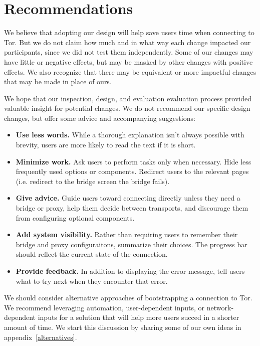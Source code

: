 \documentclass[USenglish,oneside,twocolumn]{article}
\begin{document}
\section{Recommendations}
\label{recommendations}
We believe that adopting our design will help save users time when connecting to Tor. But we do not claim how much and in what way each change impacted our participants, since we did not test them independently. Some of our changes may have little or negative effects, but may be masked by other changes with positive effects. We also recognize that there may be equivalent or more impactful changes that may be made in place of ours. 

We hope that our inspection, design, and evaluation evaluation process provided valuable insight for potential changes. We do not recommend our specific design changes, but offer some advice and accompanying suggestions: \\

\begin{itemize}
\item {\bfseries Use less words.} While a thorough explanation isn't always possible with brevity, users are more likely to read the text if it is short.
\item {\bfseries Minimize work.} Ask users to perform tasks only when necessary. Hide less frequently used options or components. Redirect users to the relevant pages (i.e. redirect to the bridge screen the bridge fails).  
\item {\bfseries Give advice.} Guide users toward connecting directly unless they need a bridge or proxy, help them decide between transports, and discourage them from configuring optional components. 
\item {\bfseries Add system visibility.} Rather than requiring users to remember their bridge and proxy configuraitons, summarize their choices. The progress bar should reflect the current state of the connection.
\item {\bfseries Provide feedback.} In addition to displaying the error message, tell users what to try next when they encounter that error. 
\end{itemize}

We should consider alternative approaches of bootstrapping a connection to Tor. We recommend leveraging automation, user-dependent inputs, or network-dependent inputs for a solution that will help more users succed in a shorter amount of time. We start this discussion by sharing some of our own ideas in appendix~\ref{alternatives}. 
\end{document}
